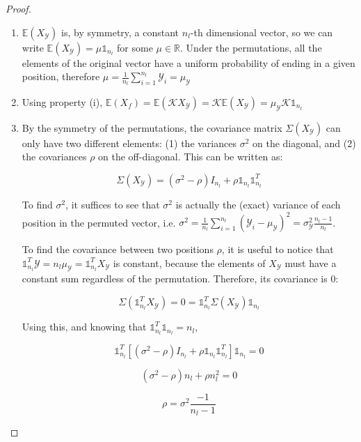 \documentclass[12pt]{article}  %
\begin{document}
\begin{proof}

\begin{enumerate}[label=(\roman*)]
\item $ \mathds{E}(X_{\mathcal{Y}}) $ is, by symmetry, a constant $n_l$-th dimensional vector, so we can write $ \mathds{E}(X_{\mathcal{Y}}) = \mu \mathbb{1}_{n_l}$ for some $\mu \in \mathds{R}$. 
Under the permutations, all the elements of the original vector have a uniform probability of ending in a given position, therefore $\mu = \frac{1}{n_l}\sum_{i = 1}^{n_l}\mathcal{Y}_i = \mu_{\mathcal{Y}}$

\item Using property (i), $ \mathds{E}(X_f) = \mathds{E}(\mathcal{K}  X_{\mathcal{Y}}) = \mathcal{K} \mathds{E}(X_{\mathcal{Y}}) = \mu_{\mathcal{Y}} \mathcal{K}  \mathbb{1}_{n_l}$

\item By the symmetry of the permutations, the covariance matrix $\Sigma(X_{\mathcal{Y}})$ can only have two different elements: (1) the variances $\sigma^2$ on the diagonal, and (2) the covariances $\rho$ on the off-diagonal. 
This can be written as:

$$ \Sigma(X_{\mathcal{Y}}) = (\sigma^2 - \rho) I_{n_l} + \rho \mathbb{1}_{n_l}\mathbb{1}_{n_l}^T $$

To find $\sigma^2$, it suffices to see that $\sigma^2$ is actually the (exact) variance of each position in the permuted vector, i.e. $\sigma^2 = \frac{1}{n_l}\sum_{i = 1}^{n_l} (\mathcal{Y}_i - \mu_{\mathcal{Y}})^2 = \sigma_{\mathcal{Y}}^2 \frac{n_l - 1}{n_l}$. 

To find the covariance between two positions $\rho$, it is useful to notice that $\mathbb{1}_{n_l}^T  \mathcal{Y} = n_l\mu_{\mathcal{Y}}= \mathbb{1}_{n_l}^T  X_{\mathcal{Y}} $ is constant, because the elements of $X_{\mathcal{Y}}$ must have a constant sum regardless of the permutation. 
Therefore, its covariance is $0$:

$$ \Sigma(\mathbb{1}_{n_l}^T  X_{\mathcal{Y}}) = 0 = \mathbb{1}_{n_l}^T  \Sigma(X_{\mathcal{Y}})  \mathbb{1}_{n_l} $$

Using this, and knowing that $ \mathbb{1}_{n_l}^T  \mathbb{1}_{n_l} = {n_l}$,

$$ \mathbb{1}_{n_l}^T  \left[ (\sigma^2 - \rho) I_{n_l} + \rho \mathbb{1}_{n_l}\mathbb{1}_{n_l}^T \right] \mathbb{1}_{n_l}  = 0 $$

$$ (\sigma^2 - \rho)n_l +  \rho n_l^2 = 0 $$

$$ \rho = \sigma^2\frac{-1}{n_l - 1} $$


\end{enumerate}
\end{proof}
\end{document}
